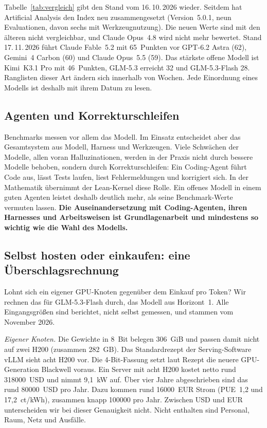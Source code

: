 \documentclass[a4paper,11pt]{article}
\begin{document}
Tabelle~\ref{tab:vergleich} gibt den Stand vom 16.\,10.\,2026 wieder.
Seitdem hat Artificial Analysis den Index neu zusammengesetzt
(Version~5.0.1, neun Evaluationen, davon sechs mit Werkzeugnutzung).
Die neuen Werte sind mit den älteren nicht vergleichbar, und Claude
Opus~4.8 wird nicht mehr bewertet.  Stand 17.\,11.\,2026 führt Claude
Fable~5.2 mit 65~Punkten vor GPT-6.2 Astra (62), Gemini~4 Carbon (60)
und Claude Opus~5.5 (59).  Das stärkste offene Modell ist Kimi~K3.1
Pro mit 46~Punkten, GLM-5.3 erreicht 32 und GLM-5.3-Flash 28.
Ranglisten dieser Art ändern sich innerhalb von Wochen.  Jede
Einordnung eines Modells ist deshalb mit ihrem Datum zu lesen.

\subsection{Agenten und Korrekturschleifen}
\label{sec:agenten}

Benchmarks messen vor allem das Modell. Im Einsatz entscheidet aber
das Gesamtsystem aus Modell, Harness und Werkzeugen. Viele Schwächen
der Modelle, allen voran Halluzinationen, werden in der Praxis nicht
durch bessere Modelle behoben, sondern durch Korrekturschleifen: Ein
Coding-Agent führt Code aus, lässt Tests laufen, liest Fehlermeldungen
und korrigiert sich. In der Mathematik übernimmt der Lean-Kernel diese
Rolle. Ein offenes Modell in einem guten Agenten leistet deshalb
deutlich mehr, als seine Benchmark-Werte vermuten lassen. \textbf{Die
  Auseinandersetzung mit Coding-Agenten, ihren Harnesses und
  Arbeitsweisen ist Grundlagenarbeit und mindestens so wichtig wie die
  Wahl des Modells.}

\subsection{Selbst hosten oder einkaufen: eine Überschlagsrechnung}
\label{sec:hosten}

Lohnt sich ein eigener GPU-Knoten gegenüber dem Einkauf pro Token?
Wir rechnen das für GLM-5.3-Flash durch, das Modell aus Horizont~1.
Alle Eingangsgrößen sind berichtet, nicht selbst gemessen, und stammen
vom November 2026.

\emph{Eigener Knoten.}  Die Gewichte in 8~Bit belegen 306~GiB und
passen damit nicht auf zwei H200 (zusammen 282~GB).  Das Standardrezept
der Serving-Software vLLM sieht acht H200 vor.  Die 4-Bit-Fassung
setzt laut Rezept die neuere GPU-Generation Blackwell voraus.  Ein
Server mit acht H200 kostet netto rund \num{318000}~USD und nimmt
9,1~kW auf.  Über vier Jahre abgeschrieben sind das rund
\num{80000}~USD pro Jahr.  Dazu kommen rund \num{16000}~EUR Strom
(PUE~1,2 und 17,2~ct/kWh), zusammen knapp \num{100000} pro Jahr.
Zwischen USD und EUR unterscheiden wir bei dieser Genauigkeit nicht.
Nicht enthalten sind Personal, Raum, Netz und Ausfälle.
\end{document}
